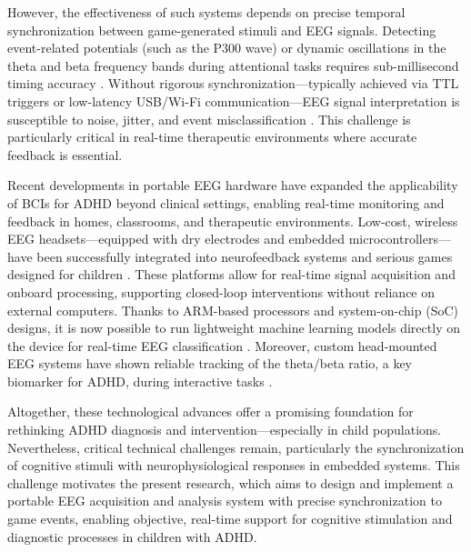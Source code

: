 However, the effectiveness of such systems depends on precise temporal synchronization between game-generated stimuli and EEG signals. Detecting event-related potentials (such as the P300 wave) or dynamic oscillations in the theta and beta frequency bands during attentional tasks requires sub-millisecond timing accuracy \cite{Wikstrom2022, Sandstrak2024}. Without rigorous synchronization—typically achieved via TTL triggers or low-latency USB/Wi-Fi communication—EEG signal interpretation is susceptible to noise, jitter, and event misclassification \cite{iwama2023two}. This challenge is particularly critical in real-time therapeutic environments where accurate feedback is essential.

Recent developments in portable EEG hardware have expanded the applicability of BCIs for ADHD beyond clinical settings, enabling real-time monitoring and feedback in homes, classrooms, and therapeutic environments. Low-cost, wireless EEG headsets—equipped with dry electrodes and embedded microcontrollers—have been successfully integrated into neurofeedback systems and serious games designed for children \cite{Xu2018}. These platforms allow for real-time signal acquisition and onboard processing, supporting closed-loop interventions without reliance on external computers. Thanks to ARM-based processors and system-on-chip (SoC) designs, it is now possible to run lightweight machine learning models directly on the device for real-time EEG classification \cite{Wang_2020}. Moreover, custom head-mounted EEG systems have shown reliable tracking of the theta/beta ratio, a key biomarker for ADHD, during interactive tasks \cite{Larocco2020}.

Altogether, these technological advances offer a promising foundation for rethinking ADHD diagnosis and intervention—especially in child populations. Nevertheless, critical technical challenges remain, particularly the synchronization of cognitive stimuli with neurophysiological responses in embedded systems. This challenge motivates the present research, which aims to design and implement a portable EEG acquisition and analysis system with precise synchronization to game events, enabling objective, real-time support for cognitive stimulation and diagnostic processes in children with ADHD.




